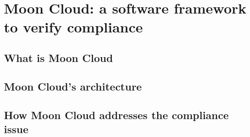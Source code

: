 \documentclass[../main.tex]{subfiles}
\begin{document}
\chapter{Moon Cloud: a software framework to verify compliance}
\section{What is Moon Cloud}
\section{Moon Cloud's architecture}
\section{How Moon Cloud addresses the compliance issue}
\end{document}
